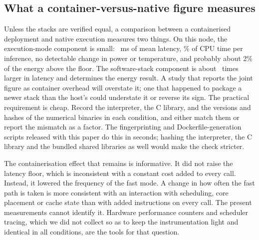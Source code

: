 \documentclass[10pt,journal,compsoc]{IEEEtran}
\begin{document}
\subsection{What a container-versus-native figure measures}
Unless the stacks are verified equal, a comparison between a containerised deployment and native execution measures two things. On this node, the execution-mode component is small: \LatMeanBAabs~ms of mean latency, \CPUmsBApctabs\% of CPU time per inference, no detectable change in power or temperature, and probably about 2\% of the energy above the floor. The software-stack component is about \StackToContainerRatio\ times larger in latency and determines the energy result. A study that reports the joint figure as container overhead will overstate it; one that happened to package a newer stack than the host's could understate it or reverse its sign. The practical requirement is cheap. Record the interpreter, the C library, and the versions and hashes of the numerical binaries in each condition, and either match them or report the mismatch as a factor. The fingerprinting and Dockerfile-generation scripts released with this paper do this in seconds; hashing the interpreter, the C library and the bundled shared libraries as well would make the check stricter.

The containerisation effect that remains is informative. It did not raise the latency floor, which is inconsistent with a constant cost added to every call. Instead, it lowered the frequency of the fast mode. A change in how often the fast path is taken is more consistent with an interaction with scheduling, core placement or cache state than with added instructions on every call. The present measurements cannot identify it. Hardware performance counters and scheduler tracing, which we did not collect so as to keep the instrumentation light and identical in all conditions, are the tools for that question.
\end{document}
